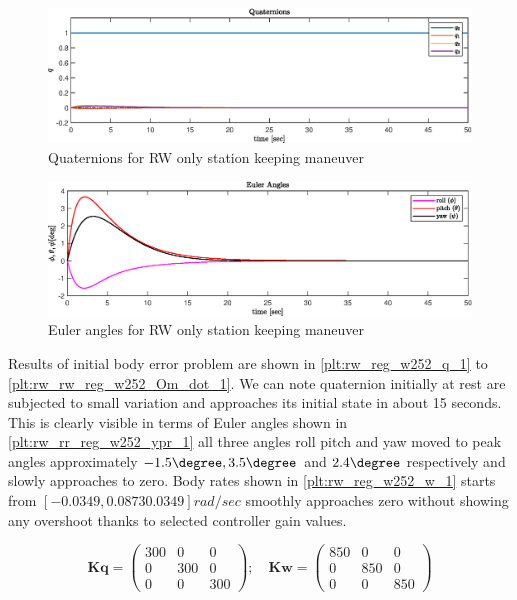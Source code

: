 \begin{figure}[H]
     \centering
    \includegraphics[width=0.8\columnwidth]{figures/plots/RW/rw_reg_w252_q.eps}
    \caption{Quaternions for RW only station keeping maneuver}
    \label{plt:rw_reg_w252_q_1}
\end{figure}


\begin{figure}[H]
    \centering
    \includegraphics[width=0.8\columnwidth]{figures/plots/RW/rw_reg_w252_ypr.eps}
    \caption{Euler angles for RW only station keeping maneuver}
    \label{plt:rw_rr_reg_w252_ypr_1}
\end{figure}
\noindent Results of initial body error problem are shown in \autoref{plt:rw_reg_w252_q_1} to  \autoref{plt:rw_rw_reg_w252_Om_dot_1}. We can note quaternion initially at rest are subjected to small variation and approaches its initial state in about 15 seconds. This is clearly visible in terms of Euler angles shown in \autoref{plt:rw_rr_reg_w252_ypr_1} all three angles roll pitch and yaw moved to peak angles approximately $ -1.5\degree, 3.5\degree $ and $ 2.4\degree $ respectively and slowly approaches to zero. Body rates shown in \autoref{plt:rw_reg_w252_w_1} starts from $ [-0.0349, 0.0873 0.0349] rad/sec$ smoothly approaches zero without showing any overshoot thanks to selected controller gain values. 

\begin{equation}
\mathbf{Kq} =\begin{pmatrix}
300 & 0 & 0\\
0 & 300 & 0\\
0 & 0 & 300
\end{pmatrix} ;\quad \mathbf{Kw} =\begin{pmatrix}
850 & 0 & 0\\
0 & 850 & 0\\
0 & 0 & 850
\end{pmatrix}
\label{eqn:RWO_gains}
\end{equation}

